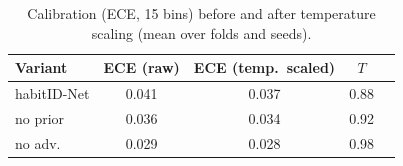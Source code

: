 \begin{table}[t]
\caption{Calibration (ECE, 15 bins) before and after temperature scaling (mean over folds and seeds).}
\label{tab:calib}
\centering
\small
\begin{tabular}{lcccc}
\toprule
Variant & ECE (raw) & ECE (temp.\ scaled) & $T$ \\
\midrule
habitID-Net & 0.041 & 0.037 & 0.88 \\
no prior & 0.036 & 0.034 & 0.92 \\
no adv. & 0.029 & 0.028 & 0.98 \\
\bottomrule
\end{tabular}
\end{table}
